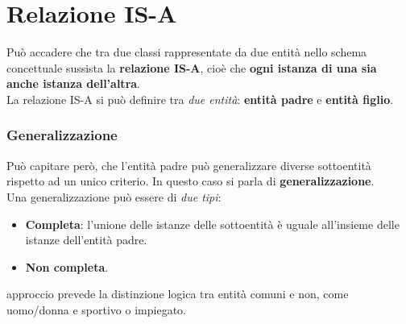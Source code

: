 \documentclass[12pt, a4paper]{article}
\begin{document}
    \section{Relazione IS-A}
    Può accadere che tra due classi rappresentate da due entità nello schema concettuale sussista la 
    \textbf{relazione IS-A}, cioè che \textbf{ogni istanza di una sia anche istanza dell'altra}.
    \\La relazione IS-A si può definire tra \textit{due entità}: \textbf{entità padre} e \textbf{entità figlio}.

    \newpage
    \subsubsection{Generalizzazione}
    Può capitare però, che l'entità padre può generalizzare diverse sottoentità rispetto ad un unico criterio. 
    In questo caso si parla di \textbf{generalizzazione}.
    \\Una generalizzazione può essere di \textit{due tipi}:
    \begin{itemize}
        \item \textbf{Completa}: l'unione delle istanze delle sottoentità è uguale all'insieme delle istanze dell'entità padre.
        \item \textbf{Non completa}.
    \end{itemize}
    approccio prevede la distinzione logica tra entità comuni e non, come uomo/donna e sportivo o impiegato.
\end{document}
